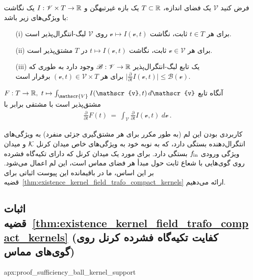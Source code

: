 \begin{thm}
\label{thm:differentiation_lemma}
    فرض کنید $\mathscr{V}$ یک فضای اندازه، $T\subset\mathbb{R}$ یک بازه غیرتبهگن و $I: \mathscr{V} \times T \to \mathbb{R}$ یک نگاشت با ویژگی‌های زیر باشد:
    \begin{itemize}
        \item[(i)] برای هر $t\in T$ ثابت، نگاشت $\mathscr{v} \mapsto I(\mathscr{v},t)$ روی $\mathscr{V}$ لبگ-انتگرال‌پذیر است.
        \item[(ii)] برای هر $\mathscr{v} \in \mathscr{V}$ ثابت، نگاشت $t\mapsto I(\mathscr{v},t)$ در $T$ مشتق‌پذیر است.
        \item[(iii)] یک تابع لبگ-انتگرال‌پذیر $\mathscr{B}: \mathscr{V} \to \mathbb{R}$ وجود دارد به طوری که
                $\big| \frac{\partial}{\partial t} I(\mathscr{v},t) \big| \leq \mathscr{B}(\mathscr{v})$
                برای هر $(\mathscr{v},t) \in \mathscr{V} \times T$ برقرار است.
    \end{itemize}
    آنگاه تابع $F: T \to \R,\ t \mapsto \int_\mathscr{V} I(\mathscr{v},t)\, d\mathscr{v}$ مشتق‌پذیر است
    با مشتقی برابر با
    \begin{align*}
        \frac{\partial}{\partial t} F(t)\ =\ \int_\mathscr{V} \frac{\partial}{\partial t} I(\mathscr{v},t)\; d\mathscr{v} \,.
    \end{align*}
\end{thm}
کاربردی بودن این لم (به طور مکرر برای هر مشتق‌گیری جزئی منفرد) به ویژگی‌های انتگرال‌دهنده بستگی دارد، که به نوبه خود به ویژگی‌های خاص میدان کرنل $\mathcal{K}$ و میدان ویژگی ورودی $f_\textup{\;\!\!in}$ بستگی دارد.
برای مورد یک میدان کرنل که دارای تکیه‌گاه فشرده روی گوی‌هایی با شعاع ثابت حول مبدأ هر فضای مماس است، این لم اعمال می‌شود.
بر این اساس، ما در باقیمانده این پیوست اثباتی برای قضیه~\ref{thm:existence_kernel_field_trafo_compact_kernels} ارائه می‌دهیم.










\toclesslab\subsection{اثبات قضیه~\ref{thm:existence_kernel_field_trafo_compact_kernels} (کفایت تکیه‌گاه فشرده کرنل روی گوی‌های مماس)}{apx:proof_sufficiency_ball_kernel_support}

